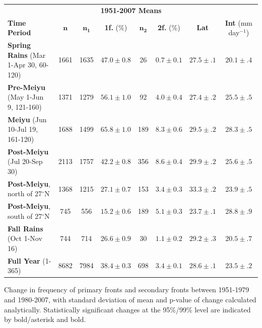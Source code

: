 \documentclass[draft,grl]{agutexSI}
\begin{document}
\begin{article}
\begin{table}
\begin{tabular}{ l c c c c c c c}
	 \multicolumn{8}{c}{\textbf{1951-2007 Means}} \\
	 \textbf{Time Period} & $\boldsymbol{n}$ & $\boldsymbol{n_1}$ & \textbf{1f.} (\%) & $\boldsymbol{n_2}$ & \textbf{2f.} (\%) & \textbf{Lat} & \textbf{Int} (mm day$^{-1}$) \\
	 \hline
	\textbf{Spring Rains} (Mar 1-Apr 30, 60-120) & 1661 & 1635 & $47.0 \pm 0.8$ & 26 & $0.7 \pm 0.1$ & $27.5 \pm .1$ & $20.1 \pm .4$ \\
	\textbf{Pre-Meiyu} (May 1-Jun 9, 121-160) & 1371 & 1279 & $56.1 \pm 1.0$ & 92 & $4.0 \pm 0.4$ & $27.4 \pm .2$ & $25.5 \pm .5$ \\
	\textbf{Meiyu} (Jun 10-Jul 19, 161-120) & 1688 & 1499 &$65.8 \pm 1.0$ & 189 & $8.3 \pm 0.6$ & $29.5 \pm .2$ & $28.3 \pm .5$ \\
	\textbf{Post-Meiyu} (Jul 20-Sep 30) & 2113 & 1757 & $42.2 \pm 0.8 $ & 356 & $8.6 \pm 0.4$ & $29.9 \pm .2$ & $25.6 \pm .5$ \\
	\textbf{Post-Meiyu}, north of 27$^\circ$N & 1368 & 1215 & $27.1 \pm 0.7 $ & 153 & $3.4 \pm 0.3$ & $33.3 \pm .2$ & $23.9 \pm .5$ \\
	\textbf{Post-Meiyu}, south of 27$^\circ$N & 745 & 556 & $15.2 \pm 0.6 $ & 189 & $5.1 \pm 0.3$ & $23.7 \pm .1$ & $28.8 \pm .9$ \\
	\textbf{Fall Rains} (Oct 1-Nov 16) & 744 & 714 & $26.6 \pm 0.9 $ & 30 & $1.1 \pm 0.2$ & $29.2 \pm .3$ & $20.5 \pm .7$ \\
	\textbf{Full Year} (1-365) & 8682 & 7984 & $38.4 \pm 0.3$ & 698 & $3.4 \pm 0.1$ & $28.6 \pm .1$ & $23.5 \pm .2$ \\
\end{tabular}
\end{table}


\begin{table}

\centering

\caption{Change in frequency of primary fronts and secondary fronts between 1951-1979 and 1980-2007, with standard deviation of mean and p-value of change calculated analytically. Statistically significant changes at the 95\%/99\% level are indicated by bold/asterisk and bold.}


\end{table}
\end{article}
\end{document}
